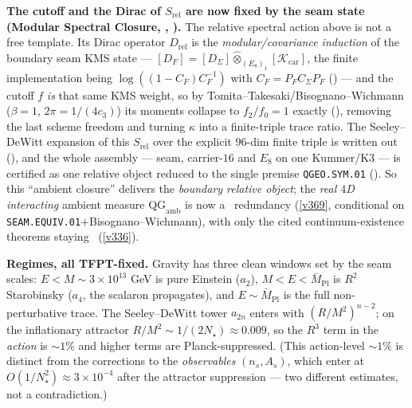 \documentclass[11pt,a4paper]{article}
\newcommand{\Mbar}{\bar M_{\mathrm{Pl}}}
\newcommand{\cthree}{c_3}
\theoremstyle{definition}
\begin{document}
\par\smallskip\noindent\textbf{The cutoff and the Dirac of $S_{\mathrm{rel}}$ are now fixed by the seam state
(Modular Spectral Closure, , ).}
The relative spectral action above is not a free template. Its Dirac operator $D_{\mathrm{rel}}$ is the
\emph{modular/covariance induction} of the boundary seam KMS state --- $[D_F]=[D_\Sigma]\widehat\otimes_{(E_8)_1}
[\mathcal K_{\mathrm{car}}]$, the finite implementation being $\log((1{-}C_F)C_F^{-1})$ with $C_F=P_F C_\Sigma
P_F$ () --- and the cutoff $f$ \emph{is} that same KMS weight, so by
Tomita--Takesaki/Bisognano--Wichmann ($\beta{=}1$, $2\pi{=}1/(4\cthree)$) its moments collapse to $f_2/f_0=1$
exactly (), removing the last scheme freedom and turning $\kappa$ into a
finite-triple trace ratio. The Seeley--DeWitt expansion of this $S_{\mathrm{rel}}$ over the explicit $96$-dim
finite triple is written out (), and the whole assembly --- seam,
carrier-$16$ and $E_8$ on one Kummer/K3 --- is certified as one relative object reduced to the single premise
\texttt{QGEO.SYM.01} (). So this ``ambient closure'' delivers the
\emph{boundary relative object}; the \emph{real $4$D interacting} ambient measure $\mathrm{QG}_{\mathrm{amb}}$ is
now a \mC\ redundancy (\vref{v369}, conditional on \texttt{SEAM.EQUIV.01}${+}$Bisognano--Wichmann), with only the
cited continuum-existence theorems staying \mO\ (\vref{v336}).

\noindent\textbf{Regimes, all TFPT-fixed.} Gravity has three clean windows set by the seam scales:
$E<M\!\sim\!3\times10^{13}$ GeV is pure Einstein ($a_2$), $M<E<\Mbar$ is $R^2$ Starobinsky ($a_4$, the
scalaron propagates), and $E\sim\Mbar$ is the full non-perturbative trace. The Seeley--DeWitt tower
$a_{2n}$ enters with $(R/M^2)^{n-2}$; on the inflationary attractor $R/M^2\sim1/(2N_\star)\approx0.009$,
so the $R^3$ term in the \emph{action} is $\sim1\%$ and higher terms are Planck-suppressed. (This action-level
$\sim1\%$ is distinct from the corrections to the \emph{observables} $(n_s,A_s)$, which enter at
$O(1/N_\star^2)\approx3\times10^{-4}$ after the attractor suppression --- two different estimates, not a
contradiction.)
\end{document}

